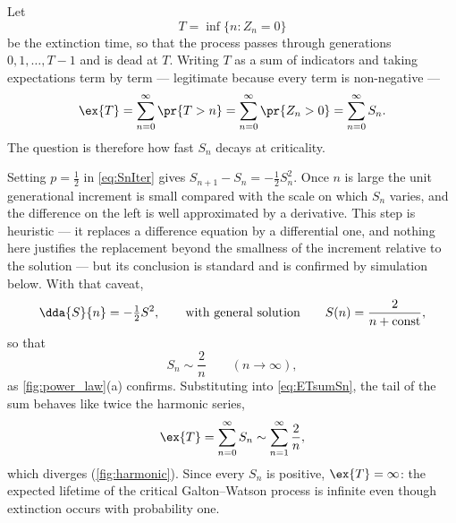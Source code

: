 Let
\begin{equation*}
T = \inf\{n : Z_n = 0\}
\end{equation*}
be the extinction time, so that the process passes through generations
$0,1,\dots,T-1$ and is dead at $T$. Writing $T$ as a sum of indicators and taking
expectations term by term --- legitimate because every term is non-negative ---
\begin{equation}
\label{eq:ETsumSn}
\ex{T} = \sum_{n=0}^{\infty}\pr{T>n} = \sum_{n=0}^{\infty}\pr{Z_n>0}
= \sum_{n=0}^{\infty}S_n .
\end{equation}
The question is therefore how fast $S_n$ decays at criticality.

Setting $p=\tfrac12$ in \cref{eq:SnIter} gives $S_{n+1}-S_n = -\tfrac12 S_n^2$.
Once $n$ is large the unit generational increment is small compared with the scale
on which $S_n$ varies, and the difference on the left is well approximated by a
derivative. This step is heuristic --- it replaces a difference equation by a
differential one, and nothing here justifies the replacement beyond the smallness
of the increment relative to the solution --- but its conclusion is standard and is
confirmed by simulation below. With that caveat,
\begin{equation*}
\dda{S}{n} = -\tfrac12 S^2,
\qquad\text{with general solution}\qquad
S(n) = \frac{2}{n+\text{const}},
\end{equation*}
so that
\begin{equation}
\label{eq:twoovern}
S_n \sim \frac{2}{n}\qquad(n\to\infty),
\end{equation}
as \cref{fig:power_law}(a) confirms. Substituting into \cref{eq:ETsumSn}, the tail
of the sum behaves like twice the harmonic series,
\begin{equation*}
\ex{T} = \sum_{n=0}^{\infty}S_n \sim \sum_{n=1}^{\infty}\frac{2}{n},
\end{equation*}
which diverges (\cref{fig:harmonic}). Since every $S_n$ is positive,
$\ex{T}=\infty$: the expected lifetime of the critical Galton--Watson process is
infinite even though extinction occurs with probability one.

